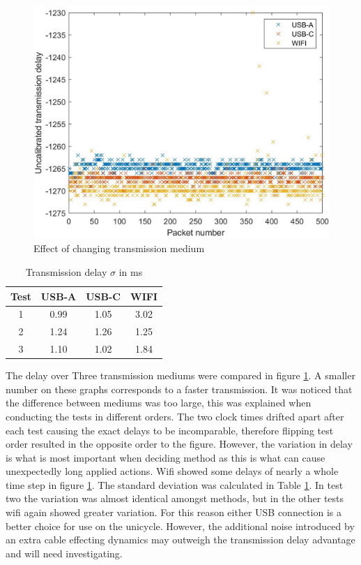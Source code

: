 \documentclass[twoside,twocolumn,12pt]{article}
\begin{document}
\begin{figure}
  \centering
    \includegraphics[width=\linewidth]{all3}
  \caption{Effect of changing transmission medium}
  \label{fig:med}
\end{figure}

\begin{table}[h]
\centering
\begin{tabular}{ c | c | c | c }
Test& USB-A & USB-C & WIFI\\ 
\midrule
1&0.99&1.05 &3.02\\
2&1.24& 1.26&1.25\\
3&1.10&1.02 &1.84\\
\end{tabular}
\caption{Transmission delay $\sigma$ in ms}
\label{table:td}
\end{table}
The delay over Three transmission mediums were compared in figure \ref{fig:med}. A smaller number on these graphs corresponds to a faster transmission. It was noticed that the difference between mediums was too large, this was explained when conducting the tests in different orders. The two clock times drifted apart after each test causing the exact delays to be incomparable, therefore flipping test order resulted in the opposite order to the figure. However, the variation in delay is what is most important when deciding method as this is what can cause unexpectedly long applied actions. Wifi showed some delays of nearly a whole time step in figure \ref{fig:med}. The standard deviation was calculated in Table \ref{table:td}. In test two the variation was almost identical amongst methods, but in the other tests wifi again showed greater variation. For this reason either USB connection is a better choice for use on the unicycle. However, the additional noise introduced by an extra cable effecting dynamics  may outweigh the transmission delay advantage and will need investigating. 
\end{document}
